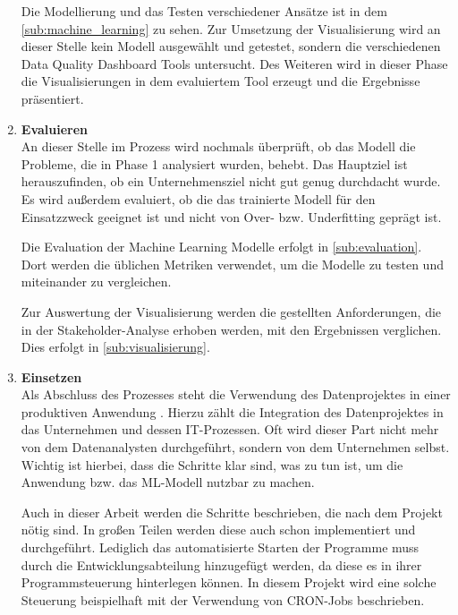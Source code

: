 \begin{enumerate}
 Die Modellierung und das Testen verschiedener Ansätze ist in dem \autoref{sub:machine_learning} zu sehen. 
 Zur Umsetzung der Visualisierung wird an dieser Stelle kein Modell ausgewählt und getestet, sondern die verschiedenen Data Quality Dashboard Tools untersucht. 
 Des Weiteren wird in dieser Phase die Visualisierungen in dem evaluiertem Tool erzeugt und die Ergebnisse präsentiert. 
 
 \item \textbf{Evaluieren} \\
 An dieser Stelle im Prozess wird nochmals überprüft, ob das Modell die Probleme, die in Phase 1 analysiert wurden, behebt.
 Das Hauptziel ist herauszufinden, ob ein Unternehmensziel nicht gut genug durchdacht wurde. \cite{wirth2000}
 Es wird außerdem evaluiert, ob die das trainierte Modell für den Einsatzzweck geeignet ist und nicht von Over- bzw. Underfitting geprägt ist. \cite{d.kelleher2015crispdm}
 
 Die Evaluation der Machine Learning Modelle erfolgt in \autoref{sub:evaluation}. 
 Dort werden die üblichen Metriken verwendet, um die Modelle zu testen und miteinander zu vergleichen. 
 
 Zur Auswertung der Visualisierung werden die gestellten Anforderungen, die in der Stakeholder-Analyse erhoben werden, mit den Ergebnissen verglichen. 
 Dies erfolgt in \autoref{sub:visualisierung}.
 
 \item \textbf{Einsetzen} \\
 Als Abschluss des Prozesses steht die Verwendung des Datenprojektes in einer produktiven Anwendung \cite{d.kelleher2015crispdm}.
 Hierzu zählt die Integration des Datenprojektes in das Unternehmen und dessen IT-Prozessen. 
 Oft wird dieser Part nicht mehr von dem Datenanalysten durchgeführt, sondern von dem Unternehmen selbst.
 Wichtig ist hierbei, dass die Schritte klar sind, was zu tun ist, um die Anwendung bzw. das ML-Modell nutzbar zu machen. \cite{wirth2000}
 
 
 Auch in dieser Arbeit werden die Schritte beschrieben, die nach dem Projekt nötig sind. 
 In großen Teilen werden diese auch schon implementiert und durchgeführt. 
 Lediglich das automatisierte Starten der Programme muss durch die Entwicklungsabteilung hinzugefügt werden, da diese es in ihrer Programmsteuerung hinterlegen können. 
 In diesem Projekt wird eine solche Steuerung beispielhaft mit der Verwendung von CRON-Jobs beschrieben. 
\end{enumerate}




